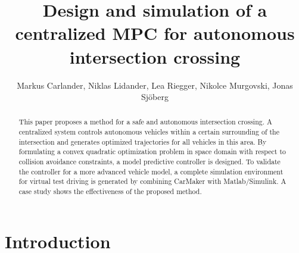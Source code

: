 \documentclass[letterpaper,10pt,conference]{ieeeconf}
\author{Markus Carlander, Niklas Lidander, Lea Riegger, Nikolce Murgovski, Jonas Sj\"oberg}
\begin{document}
\title{Design and simulation of a centralized MPC for autonomous intersection crossing}

\maketitle
\thispagestyle{empty}
\pagestyle{empty}

\begin{abstract}
This paper proposes a method for a safe and autonomous intersection crossing. A centralized system controls autonomous vehicles within a certain surrounding of the intersection and generates optimized trajectories for all vehicles in this area. By formulating a convex quadratic optimization problem in space domain with respect to collision avoidance constraints, a model predictive controller is designed. To validate the controller for a more advanced vehicle model, a complete simulation environment for virtual test driving is generated by combining CarMaker with Matlab/Simulink. A case study shows the effectiveness of the proposed method.
\end{abstract}

\IEEEpeerreviewmaketitle

\section{Introduction}%
\end{document}
